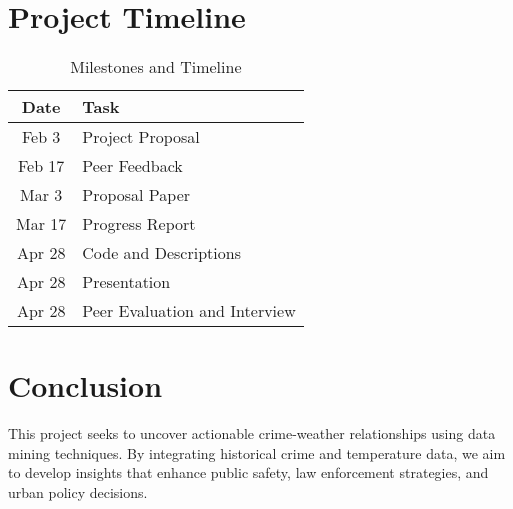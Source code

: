 \documentclass[sigconf]{acmart}
\begin{document}
\section{Project Timeline}
\begin{table}[h]
    \centering
    \begin{tabular}{|c|l|}
        \hline
        \textbf{Date} & \textbf{Task} \\
        \hline
        Feb 3 & Project Proposal \\
        Feb 17 & Peer Feedback \\
        Mar 3 & Proposal Paper \\
        Mar 17 & Progress Report \\
        Apr 28 & Code and Descriptions \\
        Apr 28 & Presentation \\
        Apr 28 & Peer Evaluation and Interview \\
        \hline
    \end{tabular}
    \caption{Milestones and Timeline}
    \label{tab:timeline}
\end{table}

\section{Conclusion}
This project seeks to uncover actionable crime-weather relationships using data mining techniques. By integrating historical crime and temperature data, we aim to develop insights that enhance public safety, law enforcement strategies, and urban policy decisions.



\end{document}
